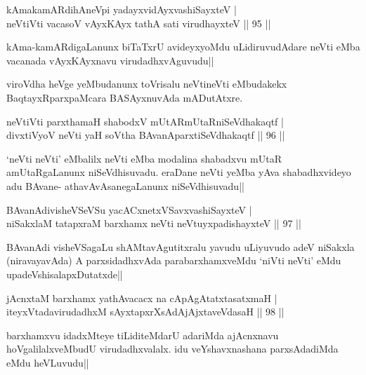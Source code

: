 \begin{shl}
kAmakamARdihAneV\s pi yadayxvidAyx\s vashiSayxteV |\\
neVtiVti vacasoV vAyxKAyx tathA sati virudhayxteV \hfill || 95 ||
\end{shl}

\begin{artha}
kAma-kamARdigaLanunx biTaTxrU avideyxyoMdu uLidiruvudAdare neVti eMba vacanada vAyxKAyxnavu virudadhxvAguvudu||
\end{artha}

\begin{artha}
viroVdha heVge yeMbudanunx toVrisalu neVtineVti eMbudakekx BaqtayxRparxpaMcara BASAyxnuvAda mADutAtxre.
\end{artha}

\begin{shl}
neVtiVti parxthamaH shabodxV mUtARmUtaRniSeVdhakaqtf |\\
divxtiVyoV neVti yaH soV\s tha BAvanAparxtiSeVdhakaqtf \hfill || 96 ||
\end{shl}

\begin{artha}
`neVti neVti' eMbalilx neVti eMba modalina shabadxvu mUtaR amUtaRgaLanunx niSeVdhisuvadu. eraDane neVti yeMba yAva shabadhxvideyo adu BAvane- athavAvAsanegaLanunx niSeVdhisuvadu||
\end{artha}


\begin{shl}
BAvanAdivisheVSeVSu yacACxnetxVSavxvashiSayxteV |\\
niSakxlaM tatapxraM barxhamx neVti neVtuyxpadishayxteV \hfill || 97 ||
\end{shl}

\begin{artha}
BAvanAdi visheVSagaLu shAMtavAgutitxralu yavudu uLiyuvudo adeV niSakxla (niravayavAda) A parxsidadhxvAda parabarxhamxveMdu `niVti neVti' eMdu upadeVshisalapxDutatxde||
\end{artha}

\begin{shl}
jAcnxtaM barxhamx yathAvacacx na cApAgAtatxtasatxmaH |\\
iteyxVtadavirudadhxM sAyxtapxrXsAdAjAjxtaveVdasaH \hfill || 98 ||
\end{shl}

\begin{artha}
barxhamxvu idadxMteye tiLiditeMdarU adariMda ajAcnxnavu hoVgalilalxveMbudU virudadhxvalalx. idu veYshavxnashana parxsAdadiMda eMdu heVLuvudu||
\end{artha}

